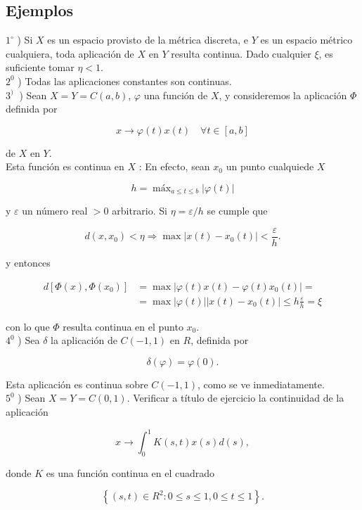 \documentclass[10pt]{article}
\theoremstyle{plain}
\theoremstyle{definition}
\theoremstyle{remark}
\begin{document}
\subsection{Ejemplos}
$1^{\circ}$ ) Si $X$ es un espacio provisto de la métrica discreta, e $Y$ es un espacio métrico cualquiera, toda aplicación de $X$ en $Y$ resulta continua. Dado cualquier $\xi$, es suficiente tomar $\eta<1$.\\
$2^{0}$ ) Todas las aplicaciones constantes son continuas.\\
$3^{\text {) }}$ ) Sean $X=Y=C(a, b)$, $\varphi$ una función de $X$, y consideremos la aplicación $\Phi$ definida por

$$
x \rightarrow \varphi(t) x(t) \quad \forall t \in[a, b]
$$

de $X$ en $Y$.\\
Esta función es continua en $X$ : En efecto, sean $x_{0}$ un punto cualquiede $X$

$$
h=\operatorname{máx}_{a \leqslant t \leqslant b}|\varphi(t)|
$$

y $\varepsilon$ un número real $>0$ arbitrario. Si $\eta=\varepsilon / h$ se cumple que


$$
d\left(x, x_{0}\right)<\eta \Rightarrow \max \left|x(t)-x_{0}(t)\right|<\frac{\varepsilon}{h} .
$$

y entonces

$$
\begin{aligned}
d\left[\Phi(x), \Phi\left(x_{0}\right)\right] & =\max \left|\varphi(t) x(t)-\varphi(t) x_{0}(t)\right|= \\
& =\max |\varphi(t)|\left|x(t)-x_{0}(t)\right| \leqslant h \frac{\varepsilon}{h}=\xi
\end{aligned}
$$

con lo que $\Phi$ resulta continua en el punto $x_{0}$.\\
$4^{0}$ ) Sea $\delta$ la aplicación de $C(-1,1)$ en $R$, definida por

$$
\delta(\varphi)=\varphi(0) .
$$

Esta aplicación es continua sobre $C(-1,1)$, como se ve inmediatamente.\\
$5^{0}$ ) Sean $X=Y=C(0,1)$. Verificar a título de ejercicio la continuidad de la aplicación

$$
x \rightarrow \int_{0}^{1} K(s, t) x(s) d(s),
$$

donde $K$ es una función continua en el cuadrado

$$
\left\{(s, t) \in R^{2}: 0 \leqslant s \leqslant 1,0 \leqslant t \leqslant 1\right\} .
$$
\end{document}
